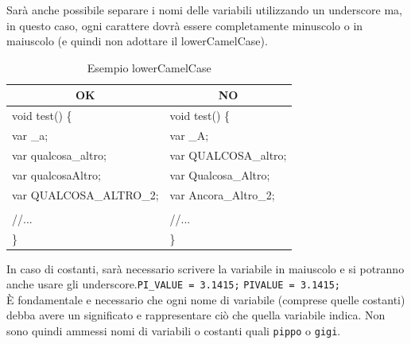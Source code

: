 Sarà anche possibile separare i nomi delle variabili utilizzando un underscore ma, in questo caso, ogni carattere dovrà essere completamente minuscolo o in maiuscolo (e quindi non adottare il lowerCamelCase).\\
\begin{table} [H]
	\begin{center}
		\begin{tabular}{ | l | l |}
			\multicolumn{1}{c}{\textbf{OK}}&\multicolumn{1}{c}{\textbf{NO}}\\ 
			\hline
			void test() \{
			&void test() \{\\
			\hspace{0.5cm}var \_a;
			&\hspace{0.5cm}var \_A;\\
			\hspace{0.5cm}var qualcosa\_altro;
			&\hspace{0.5cm}var QUALCOSA\_altro;\\
			\hspace{0.5cm}var qualcosaAltro;
			&\hspace{0.5cm}var Qualcosa\_Altro;\\
			\hspace{0.5cm}var QUALCOSA\_ALTRO\_2;
			&\hspace{0.5cm}var Ancora\_Altro\_2;\\
			&\\
			\hspace{0.5cm}//...									&
			\hspace{0.5cm}//... \\
			\}&\}\\
			\hline
		\end{tabular}
	\end{center}
	\caption{Esempio lowerCamelCase}
\end{table}
	
In caso di costanti, sarà necessario scrivere la variabile in maiuscolo e si potranno anche usare gli underscore.\hspace{1cm}\texttt{PI\_VALUE  = 3.1415;} \hspace{0.5cm} \texttt{PIVALUE = 3.1415;}\\[0.5cm]
È fondamentale e necessario che ogni nome di variabile (comprese quelle costanti) debba avere un significato e rappresentare ciò che quella variabile indica. Non sono quindi ammessi nomi di variabili o costanti quali \texttt{pippo} o \texttt{gigi}.

